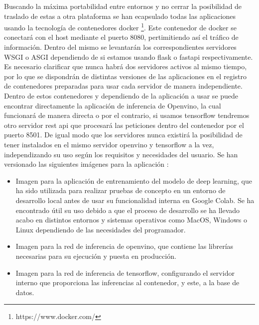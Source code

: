 Buscando la máxima portabilidad entre entornos y no cerrar la posibilidad de traslado de estas a otra plataforma se han ecapsulado todas las aplicaciones
usando la tecnología de contenedores docker \footnote{https://www.docker.com/}.
Este contenedor de docker se conectará con el host mediante el puerto 8080, pertimitiendo así el tráfico de información.
Dentro del mismo se levantarán los correspondientes servidores WSGI o ASGI dependiendo de si estamos usando flask o fastapi respectivamente.
Es necesario clarificar que nunca habrá dos servidores activos al mismo tiempo, por lo que se dispondrán de distintas versiones de las aplicaciones en el registro de contenedores
preparadas para usar cada servidor de manera independiente.
Dentro de estos contenedores y dependiendo de la aplicación a usar se puede encontrar directamente la aplicación de inferencia de Openvino, la cual funcionará de manera directa o por el contrario,
si usamos tensorflow tendremos otro servidor rest api que procesará las peticiones dentro del contenedor por el puerto 8501.
De igual modo que los servidores nunca existirá la posibilidad de tener instalados en el mismo servidor openvino y tensorflow a la vez, independizando su uso según los requisitos y necesidades del usuario.
Se han versionado las siguientes imágenes para la aplicación :
\begin{itemize}
    \item Imagen para la aplicación de entrenamiento del modelo de deep learning, que ha sido utilizada para realizar pruebas de concepto en un entorno de desarrollo local antes de usar su funcionalidad
    interna en Google Colab.
    Se ha encontrado útil su uso debido a que el proceso de desarrollo se ha llevado acabo en distintos entornos y sistemas operativos como MacOS, Windows o Linux dependiendo de las necesidades del programador.
    \item Imagen para la red de inferencia de openvino, que contiene las librerías necesarias para su ejecución y puesta en producción.
    \item Imagen para la red de inferencia de tensorflow, configurando el servidor interno que proporciona las inferencias al contenedor, y este, a la base de datos.
\end{itemize}

